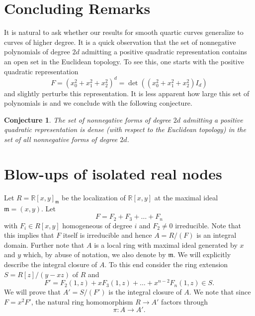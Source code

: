 \documentclass[a4paper,10pt]{amsart}
\theoremstyle{definition}
\theoremstyle{plain}
\newtheorem{con}[Def]{Conjecture}
\newcommand{\fm}{{\mathfrak m}}
\newcommand{\R}{{\mathbb R}}
\begin{document}
\section{Concluding Remarks}
It is natural to ask whether our results for smooth quartic curves generalize to curves of higher degree. It is a quick observation that the set of nonnegative polynomials of degree $2d$ admitting a positive quadratic representation contains an open set in the Euclidean topology. To see this, one starts with the positive quadratic representation
\begin{equation*}
    F = (x_0^2 + x_1^2 + x_2^2)^d = \det((x_0^2 + x_1^2 + x_2^2) I_d)
\end{equation*}
and slightly perturbs this representation.
It is less apparent how large this set of polynomials is and we conclude with the following conjecture.

\begin{con}\label{con1}
    The set of nonnegative forms of degree $2d$ admitting a positive quadratic representation is dense (with respect to the Euclidean topology) in the set of all nonnegative forms of degree $2d$.
\end{con}

\appendix

\section{Blow-ups of isolated real nodes} \label{app:realblowup}
Let $R=\R[x,y]_{\fm}$ be the localization of $\R[x,y]$ at the maximal ideal $\fm=(x,y)$. Let
\begin{equation*}
    F=F_2+F_3+\ldots+F_n
\end{equation*}
with $F_i\in R[x,y]$ homogeneous of degree $i$ and $F_2\neq0$ irreducible. Note that this implies that $F$ itself is irreducible and hence $A=R/(F)$ is an integral domain. Further note that $A$ is a local ring with maximal ideal generated by $x$ and $y$ which, by abuse of notation, we also denote by $\fm$. We will explicitly describe the integral closure of $A$. To this end consider the ring extension $S=R[z]/(y-xz)$ of $R$ and
\begin{equation*}
    F'=F_2(1,z)+xF_3(1,z)+\ldots+x^{n-2}F_n(1,z)\in S.
\end{equation*}
We will prove that $A'=S/(F')$ is the integral closure of $A$. We note that since $F=x^2F'$, the natural ring homomorphism $R\to A'$ factors through
\begin{equation*}
    \pi\colon A\to A'.
\end{equation*}
\end{document}
